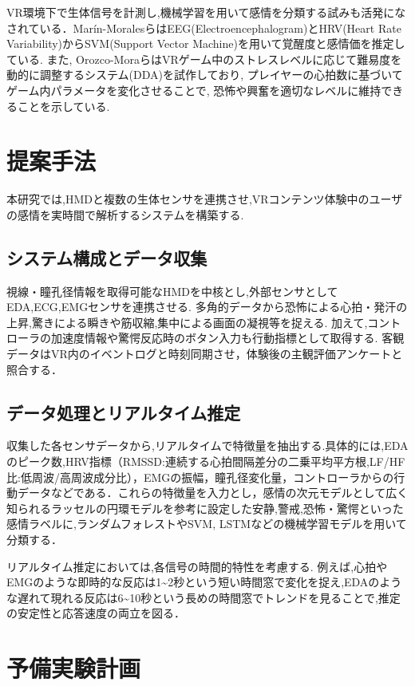 \documentclass[a4paper]{jarticle}
\begin{document}
VR環境下で生体信号を計測し,機械学習を用いて感情を分類する試みも活発になされている．Marín-Moralesら\cite{Marin-Morales2018}はEEG(Electroencephalogram)とHRV(Heart Rate Variability)からSVM(Support Vector Machine)を用いて覚醒度と感情価を推定している. また, Orozco-Moraら\cite{Orozco-Mora2024}はVRゲーム中のストレスレベルに応じて難易度を動的に調整するシステム(DDA)を試作しており, プレイヤーの心拍数に基づいてゲーム内パラメータを変化させることで, 恐怖や興奮を適切なレベルに維持できることを示している.

\section{提案手法}

本研究では,HMDと複数の生体センサを連携させ,VRコンテンツ体験中のユーザの感情を実時間で解析するシステムを構築する.

\subsection{システム構成とデータ収集}

視線・瞳孔径情報を取得可能なHMDを中核とし,外部センサとしてEDA,ECG,EMGセンサを連携させる. 多角的データから恐怖による心拍・発汗の上昇,驚きによる瞬きや筋収縮,集中による画面の凝視等を捉える. 加えて,コントローラの加速度情報や驚愕反応時のボタン入力も行動指標として取得する. 客観データはVR内のイベントログと時刻同期させ，体験後の主観評価アンケートと照合する．

\subsection{データ処理とリアルタイム推定}

収集した各センサデータから,リアルタイムで特徴量を抽出する.具体的には,EDAのピーク数,HRV指標（RMSSD:連続する心拍間隔差分の二乗平均平方根,LF/HF比:低周波/高周波成分比），EMGの振幅，瞳孔径変化量，コントローラからの行動データなどである．これらの特徴量を入力とし，感情の次元モデルとして広く知られるラッセルの円環モデル\cite{Russell1980}を参考に設定した安静,警戒,恐怖・驚愕といった感情ラベルに,ランダムフォレストやSVM, LSTMなどの機械学習モデルを用いて分類する．

リアルタイム推定においては,各信号の時間的特性を考慮する. 例えば,心拍やEMGのような即時的な反応は1\textasciitilde2秒という短い時間窓で変化を捉え,EDAのような遅れて現れる反応は6\textasciitilde10秒という長めの時間窓でトレンドを見ることで,推定の安定性と応答速度の両立を図る．

\section{予備実験計画}
\end{document}
